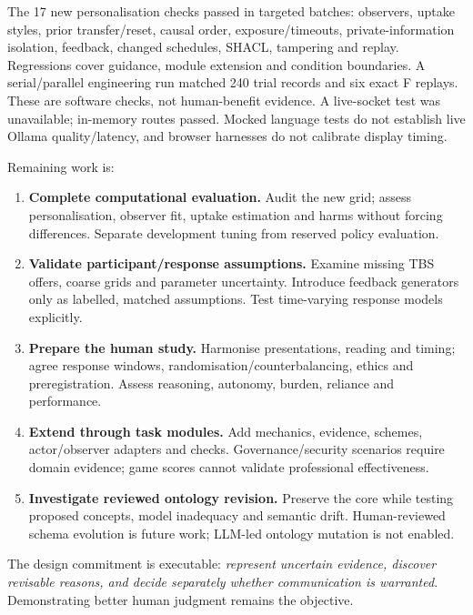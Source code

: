\documentclass[11pt,a4paper]{article}
\begin{document}
The 17 new personalisation checks passed in targeted batches: observers, uptake styles, prior transfer/reset, causal order, exposure/timeouts, private-information isolation, feedback, changed schedules, SHACL, tampering and replay. Regressions cover guidance, module extension and condition boundaries. A serial/parallel engineering run matched 240 trial records and six exact F replays. These are software checks, not human-benefit evidence. A live-socket test was unavailable; in-memory routes passed. Mocked language tests do not establish live Ollama quality/latency, and browser harnesses do not calibrate display timing.

Remaining work is:
\begin{enumerate}
\item \textbf{Complete computational evaluation.} Audit the new grid; assess personalisation, observer fit, uptake estimation and harms without forcing differences. Separate development tuning from reserved policy evaluation.
\item \textbf{Validate participant/response assumptions.} Examine missing TBS offers, coarse grids and parameter uncertainty. Introduce feedback generators only as labelled, matched assumptions. Test time-varying response models explicitly.
\item \textbf{Prepare the human study.} Harmonise presentations, reading and timing; agree response windows, randomisation/counterbalancing, ethics and preregistration. Assess reasoning, autonomy, burden, reliance and performance.
\item \textbf{Extend through task modules.} Add mechanics, evidence, schemes, actor/observer adapters and checks. Governance/security scenarios require domain evidence; game scores cannot validate professional effectiveness.
\item \textbf{Investigate reviewed ontology revision.} Preserve the core while testing proposed concepts, model inadequacy and semantic drift. Human-reviewed schema evolution is future work; LLM-led ontology mutation is not enabled.
\end{enumerate}
The design commitment is executable: \emph{represent uncertain evidence, discover revisable reasons, and decide separately whether communication is warranted}. Demonstrating better human judgment remains the objective.

\clearpage
\end{document}
